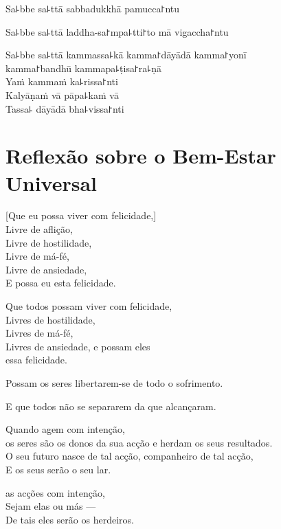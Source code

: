 Sa꜕bbe sa꜕ttā sabbadukkhā pamucca꜓ntu

Sa꜕bbe sa꜕ttā laddha-sa꜓mpa꜕tti꜓to mā vigaccha꜓ntu

Sa꜕bbe sa꜕ttā kammassa꜕kā kamma꜓dāyādā kamma꜓yonī\\
\vin kamma꜓bandhū kammapa꜕ṭisa꜓ra꜕ṇā\\
Yaṁ kammaṁ ka꜕rissa꜓nti\\
Kalyāṇaṁ vā pāpa꜕kaṁ vā\\
Tassa꜕ dāyādā bha꜕vissa꜓nti

\chapter[Bem-Estar Universal]{Reflexão sobre o Bem-Estar Universal}


\begin{leader}
\end{leader}

[Que eu possa viver com felicidade,]\\
Livre de aflição,\\
Livre de hostilidade,\\
Livre de má-fé,\\
Livre de ansiedade,\\
E possa eu  esta felicidade.

Que todos possam viver com felicidade,\\
Livres de hostilidade,\\
Livres de má-fé,\\
Livres de ansiedade, e possam eles\\
 essa felicidade.

Possam  os seres libertarem-se de todo o sofrimento.

E que todos não se separarem da  que alcançaram.

Quando agem com intenção,\\
 os seres são os donos da sua acção e herdam os seus resultados.\\
O seu futuro nasce de tal acção, companheiro de tal acção,\\
E os seus  serão o seu lar.

 as acções com intenção,\\
Sejam elas  ou más ---\\
De tais  eles serão os herdeiros.

